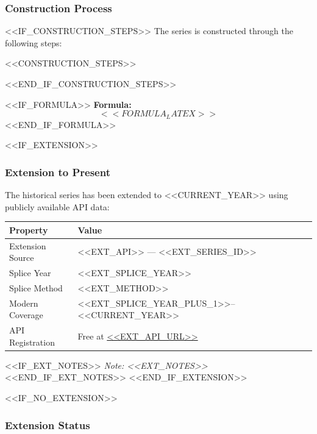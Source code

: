 \subsubsection{Construction Process}

<<IF_CONSTRUCTION_STEPS>>
The series is constructed through the following steps:

\begin{enumerate}
<<CONSTRUCTION_STEPS>>
\end{enumerate}
<<END_IF_CONSTRUCTION_STEPS>>

<<IF_FORMULA>>
\textbf{Formula:}
\begin{equation}
<<FORMULA_LATEX>>
\end{equation}
<<END_IF_FORMULA>>

<<IF_EXTENSION>>
\subsubsection{Extension to Present}

The historical series has been extended to <<CURRENT_YEAR>> using publicly available API data:

\begin{tabular}{@{} l l @{}}
\toprule
\textbf{Property} & \textbf{Value} \\
\midrule
Extension Source   & <<EXT_API>> --- <<EXT_SERIES_ID>> \\
Splice Year        & <<EXT_SPLICE_YEAR>> \\
Splice Method      & <<EXT_METHOD>> \\
Modern Coverage    & <<EXT_SPLICE_YEAR_PLUS_1>>--<<CURRENT_YEAR>> \\
API Registration   & Free at \url{<<EXT_API_URL>>} \\
\bottomrule
\end{tabular}

<<IF_EXT_NOTES>>
\smallskip
\textit{Note: <<EXT_NOTES>>}
<<END_IF_EXT_NOTES>>
<<END_IF_EXTENSION>>

<<IF_NO_EXTENSION>>
\subsubsection{Extension Status}

